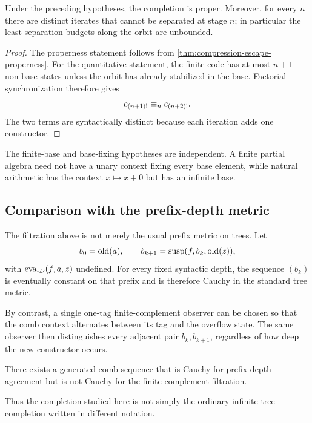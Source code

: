 \begin{theorem}
\label{thm:old-fixing-proper-completion}
Under the preceding hypotheses, the completion is proper.  Moreover, for every
$n$ there are distinct iterates that cannot be separated at stage $n$; in
particular the least separation budgets along the orbit are unbounded.
\end{theorem}

\begin{proof}
The properness statement follows from
\cref{thm:compression-escape-properness}.  For the quantitative statement, the
finite code has at most $n+1$ non-base states unless the orbit has already
stabilized in the base.  Factorial synchronization therefore gives
\[
  c_{(n+1)!}\mathrel{\equiv_{n}}c_{(n+2)!}.
\]
The two terms are syntactically distinct because each iteration adds one
constructor.
\end{proof}

The finite-base and base-fixing hypotheses are independent.  A finite partial
algebra need not have a unary context fixing every base element, while natural
arithmetic has the context $x\mapsto x+0$ but has an infinite base.

\subsection{Comparison with the prefix-depth metric}

The filtration above is not merely the usual prefix metric on trees.  Let
\[
  b_0=\operatorname{old}(a),\qquad b_{k+1}=\operatorname{susp}(f,b_k,\operatorname{old}(z)),
\]
with $\operatorname{eval}_D(f,a,z)$ undefined.  For every fixed syntactic depth, the sequence
$(b_k)$ is eventually constant on that prefix and is therefore Cauchy in the
standard tree metric.

By contrast, a single one-tag finite-complement observer can be chosen so that
the comb context alternates between its tag and the overflow state.  The same
observer then distinguishes every adjacent pair $b_k,b_{k+1}$, regardless of
how deep the new constructor occurs.

\begin{proposition}
\label{prop:depth-observation-contrast}
There exists a generated comb sequence that is Cauchy for prefix-depth
agreement but is not Cauchy for the finite-complement filtration.
\end{proposition}

Thus the completion studied here is not simply the ordinary infinite-tree
completion written in different notation.
